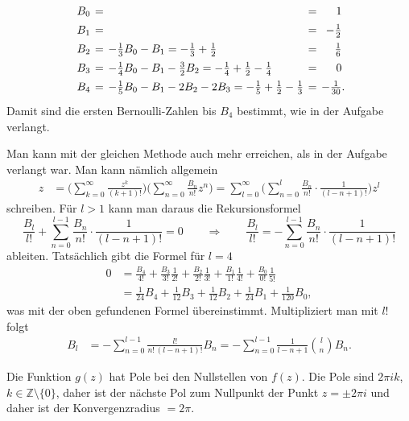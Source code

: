 \begin{loesung}
\begin{teilaufgaben}
\[
\renewcommand{\arraystretch}{1.4}
\renewcommand{\arraycolsep}{2pt}
\begin{array}{rclcr}
B_0 &=& &=&\phantom{-}1
\\
B_1 &=& &=&-\frac12
\\
B_2 &=& -\frac{1}{3} B_0 - B_1 = -\frac13 + \frac12 &=& \phantom{-}\frac{1}{6}
\\
B_3 &=& -\frac1{4}   B_0 - B_1 - \frac{3}{2} B_2
     = -\frac14 + \frac12 - \frac14
     &=& \phantom{-}0
\\
B_4 &=& -\frac1{5}   B_0 - B_1 - 2           B_2 - 2 B_3
     = -\frac1{5} +\frac12 -\frac13
     &=& -\frac1{30}\rlap{.}
\end{array}
\]
Damit sind die ersten Bernoulli-Zahlen bis $B_4$ bestimmt, wie in der
Aufgabe verlangt.

Man kann mit der gleichen Methode auch mehr erreichen, als in der
Aufgabe verlangt war.
Man kann nämlich allgemein
\begin{align*}
z
&=
\biggl(
\sum_{k=0}^\infty \frac{z^k}{(k+1)!}
\biggr)
\biggl(
\sum_{n=0}^\infty \frac{B_n}{n!}z^n
\biggr)
=
\sum_{l=0}^\infty
\biggl(
\sum_{n=0}^l
\frac{B_n}{n!}
\cdot
\frac{1}{(l-n+1)!}
\biggr)
z^l
\end{align*}
schreiben.
Für $l>1$ kann man daraus die Rekursionsformel
\[
\frac{B_l}{l!}
+
\sum_{n=0}^{l-1}
\frac{B_n}{n!}
\cdot
\frac{1}{(l-n+1)!}
=
0
\qquad\Rightarrow\qquad
\frac{B_l}{l!}
=
-
\sum_{n=0}^{l-1}
\frac{B_n}{n!}
\cdot
\frac{1}{(l-n+1)!}
\]
ableiten.
Tatsächlich gibt die Formel für $l=4$
\begin{align*}
0
&=
\frac{B_4}{4!}
+
\frac{B_3}{3!}\frac{1}{2!}
+
\frac{B_2}{2!}\frac{1}{3!}
+
\frac{B_1}{1!}\frac{1}{4!}
+
\frac{B_0}{0!}\frac{1}{5!}
\\
&=
\frac{1}{24}B_4
+
\frac{1}{12}B_3
+
\frac{1}{12}B_2
+
\frac{1}{24}B_1
+
\frac{1}{120}B_0,
\end{align*}
was mit der oben gefundenen Formel übereinstimmt.
Multipliziert man mit $l!$ folgt
\begin{align*}
B_l
&=
-
\sum_{n=0}^{l-1}
\frac{l!}{n!\,(l-n+1)!} B_n
=
-
\sum_{n=0}^{l-1}
\frac{1}{l-n+1}
\binom{l}{n}
B_n.
\end{align*}
\item
Die Funktion $g(z)$ hat Pole bei den Nullstellen von $f(z)$.
Die Pole sind $2\pi ik$, $k\in \mathbb{Z}\setminus\{0\}$, daher ist
der nächste Pol zum Nullpunkt der Punkt $z=\pm 2\pi i$ und daher 
ist der Konvergenzradius $=2\pi$.
\qedhere
\end{teilaufgaben}
\end{loesung}

